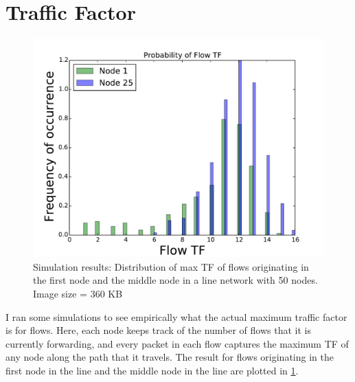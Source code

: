 \documentclass[conference]{IEEEtran}
\begin{document}
\section{Traffic Factor} 
\begin{figure}
\begin{centering}
    \includegraphics[scale=0.4, clip=true, trim=0mm 0mm 0mm 0mm]{figs_exp_vs_anal/num_nodes_50/image_size_360/timeliness_165/line_net/flow_TF_histogram.pdf}
    \caption{ Simulation results: Distribution of max TF of flows originating in the first node and the middle node in a line network with 50 nodes.  Image size = 360 KB}
    \label{fig:max_tf_dist_sim_N_50_IS_360}
\end{centering}
\end{figure}

I ran some simulations to see empirically what the actual maximum traffic factor is for flows.  Here, each node keeps track of the number of flows that it is currently forwarding, and every packet in each flow captures the maximum TF of any node along the path that it travels.  The result for flows originating in the first node in the line and the middle node in the line are plotted in \ref{fig:max_tf_dist_sim_N_50_IS_360}.  
\end{document}
